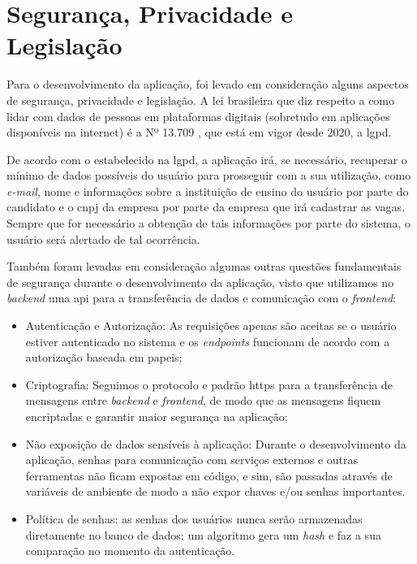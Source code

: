 \section{Segurança, Privacidade e Legislação}
Para o desenvolvimento da aplicação, foi levado em consideração alguns aspectos de segurança, privacidade e legislação.
A lei brasileira que diz respeito a como lidar com dados de pessoas em plataformas digitais (sobretudo em aplicações disponíveis na internet) é a Nº 13.709 \cite{lgpd},
que está em vigor desde 2020, a \gls{lgpd}.

De acordo com o estabelecido na \gls{lgpd}, a aplicação irá, se necessário, recuperar o mínimo de dados possíveis do usuário para prosseguir com a sua utilização, como \textit{e-mail}, nome
e informações sobre a instituição de ensino do usuário por parte do candidato e o \ac{cnpj} da empresa por parte da empresa que irá cadastrar as vagas. Sempre que for necessário a obtenção de tais informações por parte do sistema, o usuário será alertado de tal ocorrência.

Também foram levadas em consideração algumas outras questões fundamentais de segurança durante o desenvolvimento da aplicação, visto que utilizamos no \textit{\gls{backend}} uma \gls{api} para a transferência de 
dados e comunicação com o \textit{ \gls{frontend}}:
\begin{itemize}
	\item Autenticação e Autorização: As requisições apenas são aceitas se o usuário estiver autenticado no sistema e os \textit{\glspl{endpoint}} funcionam de acordo com a autorização baseada em papeis;
	\item Criptografia: Seguimos o protocolo e padrão \gls{https} para a transferência de mensagens entre \textit{\gls{backend}} e \textit{\gls{frontend}}, de modo que as mensagens fiquem encriptadas e garantir maior segurança na aplicação;
	\item Não exposição de dados sensíveis à aplicação: Durante o desenvolvimento da aplicação, senhas para comunicação com serviços externos e outras ferramentas não ficam expostas em código, e sim, são passadas	através de variáveis de ambiente de modo a não expor chaves e/ou senhas importantes.
	\item Política de senhas: as senhas dos usuários nunca serão armazenadas diretamente no banco de dados; um algoritmo gera um \textit{hash} e faz a sua comparação no momento da autenticação.
\end{itemize}